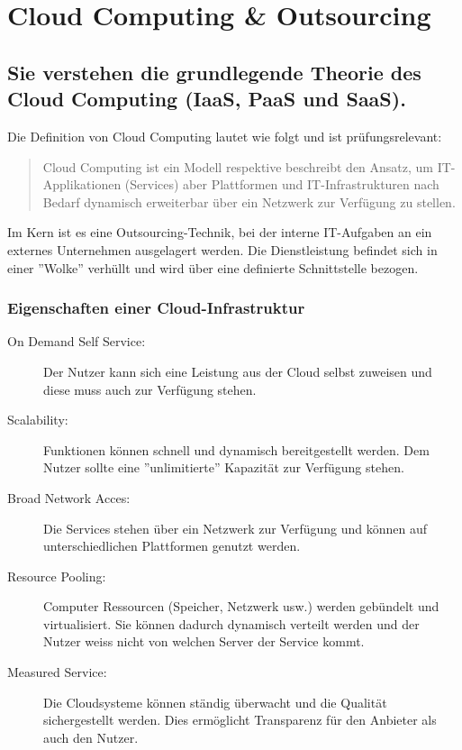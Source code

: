 \chapter{Cloud Computing \& Outsourcing}

\section{Sie verstehen die grundlegende Theorie des Cloud Computing (IaaS, PaaS und SaaS).}

Die Definition von Cloud Computing lautet wie folgt und ist prüfungsrelevant:
\begin{quote}
	Cloud Computing ist ein Modell respektive beschreibt den Ansatz, um IT-Applikationen (Services) aber Plattformen und IT-Infrastrukturen nach Bedarf dynamisch erweiterbar über ein Netzwerk zur Verfügung zu stellen.
\end{quote}
Im Kern ist es eine Outsourcing-Technik, bei der interne IT-Aufgaben an ein externes Unternehmen ausgelagert werden. Die Dienstleistung befindet sich in einer ''Wolke'' verhüllt und wird über eine definierte Schnittstelle bezogen.

\subsection{Eigenschaften einer Cloud-Infrastruktur}
\begin{description}
	\item[On Demand Self Service:] Der Nutzer kann sich eine Leistung aus der Cloud selbst zuweisen und diese muss auch zur Verfügung stehen.
	\item[Scalability:] Funktionen können schnell und dynamisch bereitgestellt werden. Dem Nutzer sollte eine ''unlimitierte'' Kapazität zur Verfügung stehen.
	\item[Broad Network Acces:] Die Services stehen über ein Netzwerk zur Verfügung und können auf unterschiedlichen Plattformen genutzt werden.
	\item[Resource Pooling:] Computer Ressourcen (Speicher, Netzwerk usw.) werden gebündelt und virtualisiert. Sie können dadurch dynamisch verteilt werden und der Nutzer weiss nicht von welchen Server der Service kommt.
	\item[Measured Service:] Die Cloudsysteme können ständig überwacht und die Qualität sichergestellt werden. Dies ermöglicht Transparenz für den Anbieter als auch den Nutzer.
\end{description}

